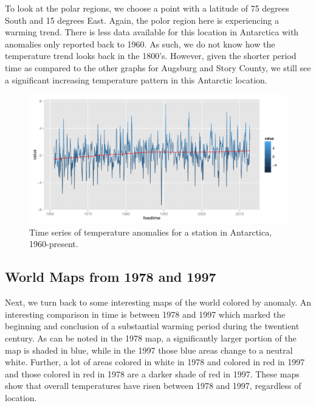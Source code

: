 \documentclass{article}\usepackage{graphicx, color}
\newenvironment{knitrout}{}{} %
\begin{document}

To look at the polar regions, we choose a point with a latitude of 75 degrees South and 15 degrees East. Again, the polor region here is experiencing a warming trend. There is less data available for this location in Antarctica with anomalies only reported back to 1960. As such, we do not know how the temperature trend looks back in the 1800's. However, given the shorter period time as compared to the other graphs for Augsburg and Story County, we still see a significant increasing temperature pattern in this Antarctic location. 

\begin{figure}[H]
\begin{knitrout}
\color{fgcolor}\includegraphics[width=\linewidth]{figure/antartic-trend} 
\end{knitrout}

\caption{\label{antarctica}Time series of temperature anomalies for a station in Antarctica, 1960-present.}
\end{figure}

\subsection{World Maps from 1978 and 1997}

Next, we turn back to some interesting maps of the world colored by anomaly. An interesting comparison in time is between 1978 and 1997 which marked the beginning and conclusion of a substantial warming period during the twentient century. As can be noted in the 1978 map, a significantly larger portion of the map is shaded in blue, while in the 1997 those blue areas change to a neutral white. Further, a lot of areas colored in white in 1978 and colored in red in 1997 and those colored in red in 1978 are a darker shade of red in 1997. These maps show that overall temperatures have risen between 1978 and 1997, regardless of location.
\end{document}
